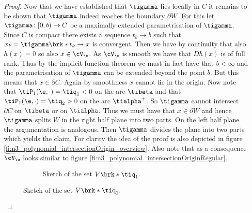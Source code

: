 \begin{proof}
  Now that we have established that $\tigamma$ lies locally in $C$ it remains to be shown that
  $\tigamma$ indeed reaches the boundary $\partial W$.
  For this let $\tigamma\colon [0,b)\to C$ be a maximally extended parametrisation of $\tigamma$.
  Since $C$ is compact there exists a sequence $t_k\to b$ such that $x_k=\tigamma\brk*{t_k}\to x$
  is convergent. Then we have by continuity that also $h(x)=0$ so also $x\in\cV_\e$.
  As $\cV_\e$ is smooth we have that $Dh(x)$ is of full rank. Thus by the implicit function theorem 
  we must in fact have that $b<\infty$ and the parametrisation of $\tigamma$ can be extended beyond
  the point $b$. But this means that $x\in\partial C$.
  Again by smoothness $x$ cannot lie in the origin. 
  Now note that
  $\tiP_1(\e,\cdot)=\tiq_1<0$ on the arc $\tibeta$ and that
  $\tiP_1(\e,\cdot)=\tiq_2>0$ on the arc $\tialpha^+$.
  So $\tigamma$ cannot intersect $\partial C$ on $\tibeta$ or on $\tialpha$.
  Thus we must have that $x\in\partial W$ and hence $\tigamma$ splits $W$ in the right half plane into two parts.
  On the left half plane the argumentation is analogous.
  Then $\tigamma$ divides the plane into two
  parts which yields the claim.
  For clarity the idea of the proof is also depicted in figure \ref{fi:n3_polynomial_intersectionOrigin_overview}.
  Also note that as a consequence $\widetilde{\cV}_\e$
  looks similar to figure \ref{fi:n3_polynomial_intersectionOriginRegular}.
  \begin{figure}
    \centering
    \begin{subfigure}[b]{0.3\textwidth}
    \centering
    
    \caption{Sketch of the set $V\brk*{\tiq_1}$.}
    \label{fi:n3_polynomial_intersectionOriginDegenerate}
    \end{subfigure}

\end{figure}
\end{proof}
